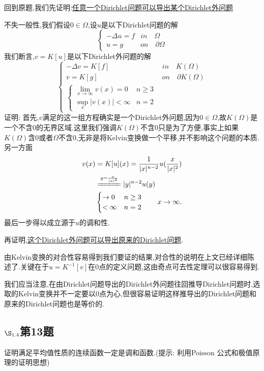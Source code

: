 \documentclass[12pt, a4paper]{ctexbook}
\begin{document}
    回到原题,我们先证明:\uline{任意一个Dirichlet问题可以导出某个Dirichlet外问题}
    
    不失一般性,我们假设$0\in \Omega$,设$u$是以下Dirichlet问题的解
    $$
    \begin{cases}
    -\Delta u=f & in \quad \Omega\\
    u= g & on  \quad \partial \Omega
    \end{cases} $$
    我们断言,$v=K[u]$是以下Dirichlet外问题的解
    $$
    \begin{cases}
    -\Delta v=K[f] & in \quad K(\Omega)\\
    v= K[g] & on  \quad \partial K(\Omega)\\
    \begin{cases}
    \lim_{x \to \infty} v(x)=0 & n\ge 3\\
    \sup_x |v(x)| < \infty &n=2
    \end{cases}
    \end{cases} $$
    证明: 首先,$v$满足的这一组方程确实是一个Dirichlet外问题,因为$0\in \Omega$,故$K(\Omega)$是一个不含$0$的无界区域.这里我们强调$K(\Omega)$不含$0$只是为了方便,事实上如果$K(\Omega)$含$0$或者$\Omega$不含$0$,无非是将Kelvin变换做一个平移,并不影响这个问题的本质.另一方面
    \begin{align*}
    v(x)&=K[u](x)=\frac{1}{|x|^{n-2}}u(\frac{x}{|x|^2})\\
    &\xlongequal{y=\frac{x}{|x|^2}} |y|^{n-2} u(y)\\
    &\begin{cases}
    \to 0 &n \ge 3\\
    < \infty &n=2
    \end{cases}\qquad x \to \infty.
    \end{align*}
    最后一步得以成立源于$u$的调和性.
    
    再证明,\uline{这个Dirichlet外问题可以导出原来的Dirichlet问题}.
    
    由Kelvin变换的对合性容易得到我们要证的结果,对合性的说明在上文已经详细陈述了.关键在于$u=K^{-1}[v]$在$0$点的定义问题,这由奇点可去性定理可以很容易得到.
    
    我们应当注意,在由Dirichlet问题导出的Dirichlet外问题往回推导Dirichlet问题时,选取的Kelvin变换并不一定要以$0$点为心,但很容易证明这样推导出的Dirichlet问题和原来的Dirichlet问题也是等价的.
    
    \subsection{$\S_{1.4}$第13题}
    \kaishu{}证明满足平均值性质的连续函数一定是调和函数.(提示: 利用Poisson 公式和极值原理的证明思想)\\
    
\end{document}
